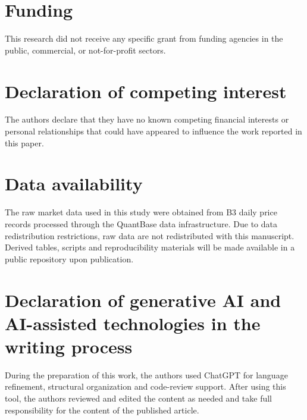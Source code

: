\section*{Funding}
This research did not receive any specific grant from funding agencies in the public, commercial, or not-for-profit sectors.

\section*{Declaration of competing interest}
The authors declare that they have no known competing financial interests or personal relationships that could have appeared to influence the work reported in this paper.

\section*{Data availability}
The raw market data used in this study were obtained from B3 daily price records processed through the QuantBase data infrastructure. Due to data redistribution restrictions, raw data are not redistributed with this manuscript. Derived tables, scripts and reproducibility materials will be made available in a public repository upon publication.

\section*{Declaration of generative AI and AI-assisted technologies in the writing process}
During the preparation of this work, the authors used ChatGPT for language refinement, structural organization and code-review support. After using this tool, the authors reviewed and edited the content as needed and take full responsibility for the content of the published article.
